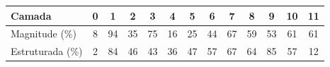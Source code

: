 \begin{tabular}{l cccccccccccc}
\hline
\textbf{Camada} & 0 & 1 & 2 & 3 & 4 & 5 & 6 & 7 & 8 & 9 & 10 & 11 \\
\hline
Magnitude (\%) & 8 & 94 & 35 & 75 & 16 & 25 & 44 & 67 & 59 & 53 & 61 & 61 \\
Estruturada (\%) & 2 & 84 & 46 & 43 & 36 & 47 & 57 & 67 & 64 & 85 & 57 & 12 \\
\hline
\end{tabular}
